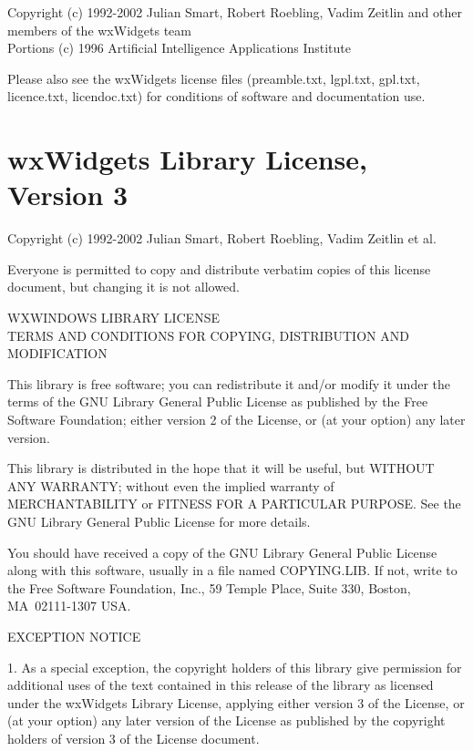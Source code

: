 \documentclass[a4paper,11pt]{report}
\begin{document}
\begin{center}
Copyright (c) 1992-2002 Julian Smart, Robert Roebling, Vadim Zeitlin and other
members of the wxWidgets team\\
Portions (c) 1996 Artificial Intelligence Applications Institute\\
\end{center}

Please also see the wxWidgets license files (preamble.txt, lgpl.txt, gpl.txt, licence.txt,
licendoc.txt) for conditions of software and documentation use.

\section*{wxWidgets Library License, Version 3}

Copyright (c) 1992-2002 Julian Smart, Robert Roebling, Vadim Zeitlin et al. 

Everyone is permitted to copy and distribute verbatim copies
of this license document, but changing it is not allowed. 

\begin{center}
WXWINDOWS LIBRARY LICENSE\\
TERMS AND CONDITIONS FOR COPYING, DISTRIBUTION AND MODIFICATION 
\end{center}

This library is free software; you can redistribute it and/or modify it 
under the terms of the GNU Library General Public License as published by 
the Free Software Foundation; either version 2 of the License, or (at 
your option) any later version. 

This library is distributed in the hope that it will be useful, but 
WITHOUT ANY WARRANTY; without even the implied warranty of 
MERCHANTABILITY or FITNESS FOR A PARTICULAR PURPOSE. See the GNU Library 
General Public License for more details. 

You should have received a copy of the GNU Library General Public License 
along with this software, usually in a file named COPYING.LIB. If not, 
write to the Free Software Foundation, Inc., 59 Temple Place, Suite 330,
Boston, MA~02111-1307 USA. 

EXCEPTION NOTICE 

1. As a special exception, the copyright holders of this library give 
permission for additional uses of the text contained in this release of 
the library as licensed under the wxWidgets Library License, applying 
either version 3 of the License, or (at your option) any later version of 
the License as published by the copyright holders of version 3 of the 
License document. 
\end{document}
